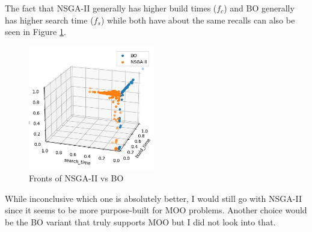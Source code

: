 The fact that NSGA-II generally has higher build times (\(f_c\)) and BO generally has higher search time (\(f_s\)) while both have about the same recalls can also be seen in Figure \ref{fig:bo-vs-nsga2}.

\begin{figure}[h]
    \centering
    \includegraphics[width=0.49\textwidth]{../images/report/bo-vs-nsga2.png}
    \caption{Fronts of NSGA-II vs BO}
    \label{fig:bo-vs-nsga2}
\end{figure}

While inconclusive which one is absolutely better, I would still go with NSGA-II since it seems to be more purpose-built for MOO problems. Another choice would be the BO variant that truly supports MOO but I did not look into that.
